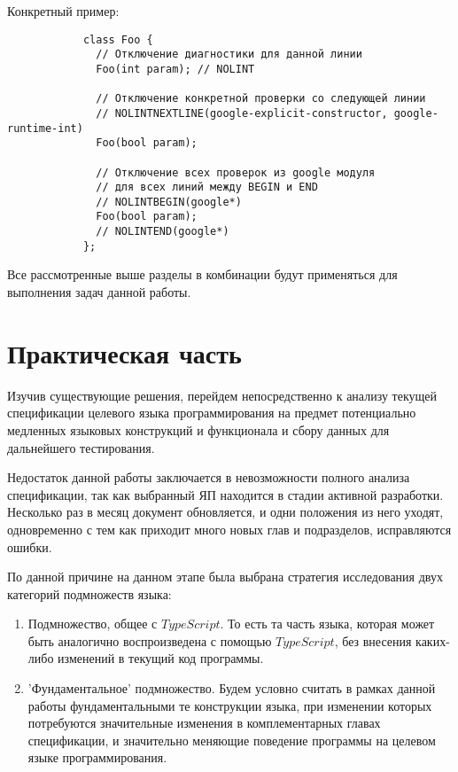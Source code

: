 \documentclass{mipt-thesis-bs}
\begin{document}
Конкретный пример:

\begin{verbatim}
            class Foo {
              // Отключение диагностики для данной линии
              Foo(int param); // NOLINT

              // Отключение конкретной проверки со следующей линии
              // NOLINTNEXTLINE(google-explicit-constructor, google-runtime-int)
              Foo(bool param);

              // Отключение всех проверок из google модуля
              // для всех линий между BEGIN и END
              // NOLINTBEGIN(google*)
              Foo(bool param);
              // NOLINTEND(google*)
            };
\end{verbatim}

Все рассмотренные выше разделы в комбинации будут применяться для выполнения задач 
данной работы.

\chapter{Практическая часть}

Изучив существующие решения, перейдем непосредственно к анализу текущей спецификации
целевого языка программирования на предмет потенциально медленных языковых конструкций и функционала и
сбору данных для дальнейшего тестирования.

Недостаток данной работы заключается в невозможности полного анализа спецификации, так как 
выбранный ЯП находится в стадии активной разработки. Несколько раз в месяц документ обновляется, и одни 
положения из него уходят, одновременно с тем как приходит много новых глав и подразделов, исправляются 
ошибки.

По данной причине на данном этапе была выбрана стратегия исследования двух категорий 
подмножеств языка:

\begin{enumerate}
    \item Подмножество, общее с $TypeScript$. То есть та часть языка, которая может быть аналогично 
    воспроизведена с помощью $TypeScript$, без внесения каких-либо изменений в текущий код программы.
    \item 'Фундаментальное' подмножество. Будем условно считать в рамках данной работы фундаментальными
    те конструкции языка, при изменении которых потребуются значительные изменения в
    комплементарных главах спецификации, и значительно меняющие поведение 
    программы на целевом языке программирования.
\end{enumerate}
\end{document}
